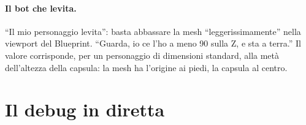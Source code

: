 \paragraph{Il bot che levita.} ``Il mio personaggio levita'': basta abbassare la mesh
``leggerissimamente'' nella viewport del Blueprint. ``Guarda, io ce l'ho a meno 90 sulla Z,
e sta a terra.'' Il valore corrisponde, per un personaggio di dimensioni standard, alla
metà dell'altezza della capsula: la mesh ha l'origine ai piedi, la capsula al centro.

\section{Il debug in diretta}
\label{ue10:sec:debug}

